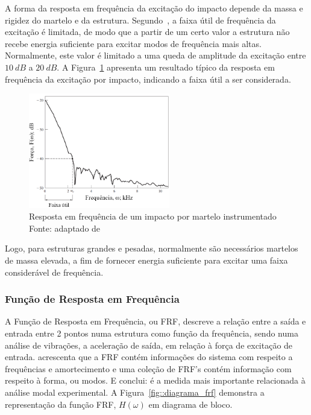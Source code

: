 A forma da resposta em frequência da excitação do impacto depende da massa e
rigidez do martelo e da estrutura. Segundo~\citet{rao2011mechanical}, a faixa
útil de frequência da excitação é limitada, de modo que a partir de um certo
valor a estrutura não recebe energia suficiente para excitar modos de frequência
mais altas. Normalmente, este valor é limitado a uma queda de amplitude da
excitação entre $10~dB$ a $20~dB$. A Figura~\ref{fig::range_hammer}
apresenta um resultado típico da resposta em frequência da excitação por impacto, indicando a
faixa útil a ser considerada.

\begin{figure}[h]
	\centering 
 	\includegraphics[width=0.55\textwidth]{figs/range_hammer}
 	\caption[Resposta em frequência de um impacto por martelo
 	instrumentado]{Resposta em frequência de um impacto por martelo
 	instrumentado \\
 	Fonte: adaptado de \cite{rao2011mechanical}}
 	\label{fig::range_hammer}
\end{figure}

Logo, para estruturas grandes e pesadas, normalmente são necessários martelos de
massa elevada, a fim de fornecer energia suficiente para excitar uma faixa
considerável de frequência.


\subsubsection{Função de Resposta em Frequência}

A Função de Resposta em Frequência, ou FRF, descreve a relação entre a saída e
entrada entre 2 pontos numa estrutura como função da frequência, sendo numa
análise de vibrações, a aceleração de saída, em relação à força de excitação de
entrada. \citet{avitabile2001experimental} acrescenta que a FRF contém
informações do sistema com respeito a frequências e amortecimento e uma coleção
de FRF's contém informação com respeito à forma, ou modos. E conclui: é a medida
mais importante relacionada à análise modal experimental. A
Figura~\ref{fig::diagrama_frf} demonstra a representação da função FRF,
$H(\omega)$ em diagrama de bloco.

